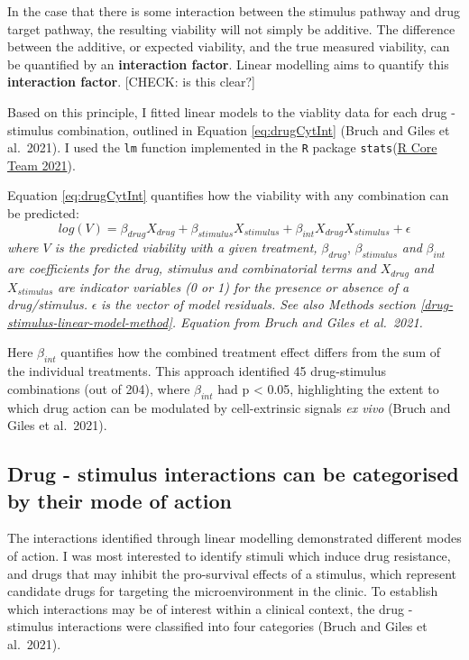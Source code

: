 \documentclass[11pt, a4paper, twosided]{book}
\begin{document}
In the case that there is some interaction between the stimulus pathway and drug target pathway, the resulting viability will not simply be additive. The difference between the additive, or expected viability, and the true measured viability, can be quantified by an \textbf{interaction factor}. Linear modelling aims to quantify this \textbf{interaction factor}. {[}CHECK: is this clear?{]}

Based on this principle, I fitted linear models to the viablity data for each drug - stimulus combination, outlined in Equation \eqref{eq:drugCytInt} (Bruch and Giles et al.~2021). I used the \texttt{lm} function implemented in the \texttt{R} package \texttt{stats}(\protect\hyperlink{ref-R-base}{R Core Team 2021}).

Equation \eqref{eq:drugCytInt} quantifies how the viability with any combination can be predicted:
\begin{equation}
            log(V) = \beta_{drug}X_{drug} + \beta_{stimulus}X_{stimulus} + \beta_{int}X_{drug}X_{stimulus} + \epsilon
                                       \label{eq:drugCytInt}
    \end{equation}
\emph{where \(V\) is the predicted viability with a given treatment,} \(\beta_{drug}\), \(\beta_{stimulus}\) \emph{and} \(\beta_{int}\) \emph{are coefficients for the drug, stimulus and combinatorial terms and} \(X_{drug}\) \emph{and} \(X_{stimulus}\) \emph{are indicator variables (0 or 1) for the presence or absence of a drug/stimulus.} \(\epsilon\) \emph{is the vector of model residuals. See also Methods section \ref{drug-stimulus-linear-model-method}. Equation from Bruch and Giles et al.~2021.}

Here \(\beta_{int}\) quantifies how the combined treatment effect differs from the sum of the individual treatments. This approach identified 45 drug-stimulus combinations (out of 204), where \(\beta_{int}\) had p \textless{} 0.05, highlighting the extent to which drug action can be modulated by cell-extrinsic signals \emph{ex vivo} (Bruch and Giles et al.~2021).

\hypertarget{drug-stimulus-categories}{%
\subsection{Drug - stimulus interactions can be categorised by their mode of action}\label{drug-stimulus-categories}}

The interactions identified through linear modelling demonstrated different modes of action. I was most interested to identify stimuli which induce drug resistance, and drugs that may inhibit the pro-survival effects of a stimulus, which represent candidate drugs for targeting the microenvironment in the clinic. To establish which interactions may be of interest within a clinical context, the drug - stimulus interactions were classified into four categories (Bruch and Giles et al.~2021).
\end{document}
